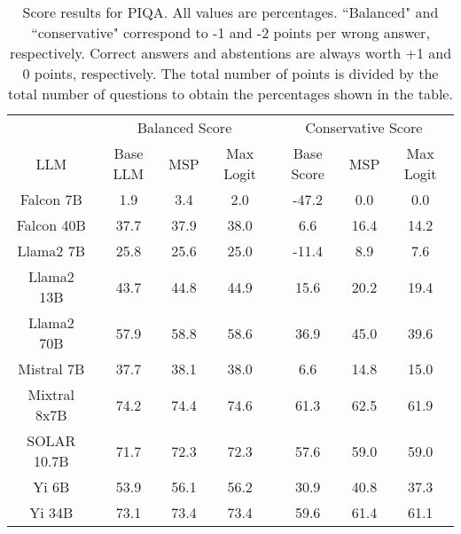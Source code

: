 \renewcommand\arraystretch{1.2}
\begin{table*}
\centering
\begin{tabular}{c|c|c|c|c|c|c}
& \multicolumn{3}{c|}{Balanced Score} & \multicolumn{3}{c}{Conservative Score} \\ 
LLM & Base LLM & MSP & Max Logit & Base Score & MSP & Max Logit\\ \hline
Falcon 7B & 1.9 & 3.4 & 2.0 & -47.2 & 0.0 & 0.0\\
Falcon 40B & 37.7 & 37.9 & 38.0 & 6.6 & 16.4 & 14.2\\
Llama2 7B & 25.8 & 25.6 & 25.0 & -11.4 & 8.9 & 7.6\\
Llama2 13B & 43.7 & 44.8 & 44.9 & 15.6 & 20.2 & 19.4\\
Llama2 70B & 57.9 & 58.8 & 58.6 & 36.9 & 45.0 & 39.6\\
Mistral 7B & 37.7 & 38.1 & 38.0 & 6.6 & 14.8 & 15.0\\
Mixtral 8x7B & 74.2 & 74.4 & 74.6 & 61.3 & 62.5 & 61.9\\
SOLAR 10.7B & 71.7 & 72.3 & 72.3 & 57.6 & 59.0 & 59.0\\
Yi 6B & 53.9 & 56.1 & 56.2 & 30.9 & 40.8 & 37.3\\
Yi 34B & 73.1 & 73.4 & 73.4 & 59.6 & 61.4 & 61.1\\
\hline
\end{tabular}
\caption{Score results for PIQA. All values are percentages. ``Balanced" and ``conservative" correspond to -1 and -2 points per wrong answer, respectively. Correct answers and abstentions are always worth +1 and 0 points, respectively. The total number of points is divided by the total number of questions to obtain the percentages shown in the table.}
\label{tab:piqa_score}
\end{table*}
